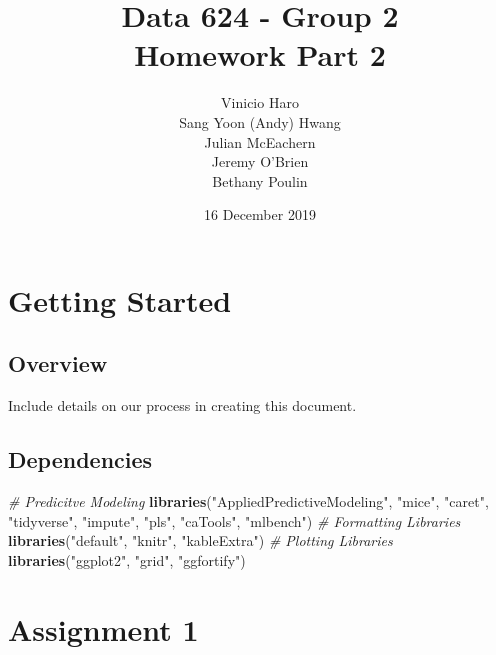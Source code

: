 \documentclass[]{report}
\title{Data 624 - Group 2\\
Homework Part 2}
\author{Vinicio Haro \\ Sang Yoon (Andy) Hwang \\ Julian McEachern \\ Jeremy O'Brien \\ Bethany Poulin}
\date{16 December 2019}
\newenvironment{Shaded}{\begin{snugshade}}{\end{snugshade}}
\newcommand{\CommentTok}[1]{\textcolor[rgb]{0.56,0.35,0.01}{\textit{#1}}}
\newcommand{\KeywordTok}[1]{\textcolor[rgb]{0.13,0.29,0.53}{\textbf{#1}}}
\newcommand{\NormalTok}[1]{#1}
\newcommand{\StringTok}[1]{\textcolor[rgb]{0.31,0.60,0.02}{#1}}
\begin{document}
\maketitle

{
\setcounter{tocdepth}{2}
\tableofcontents
}
\hypertarget{Overview}{%
\chapter*{Getting Started}\label{Overview}}

\hypertarget{overview}{%
\section{Overview}\label{overview}}

Include details on our process in creating this document.

\hypertarget{dependencies}{%
\section{Dependencies}\label{dependencies}}

\begin{Shaded}
\begin{Highlighting}[]
\CommentTok{# Predicitve Modeling}
\KeywordTok{libraries}\NormalTok{(}\StringTok{"AppliedPredictiveModeling"}\NormalTok{, }\StringTok{"mice"}\NormalTok{, }\StringTok{"caret"}\NormalTok{, }\StringTok{"tidyverse"}\NormalTok{, }
    \StringTok{"impute"}\NormalTok{, }\StringTok{"pls"}\NormalTok{, }\StringTok{"caTools"}\NormalTok{, }\StringTok{"mlbench"}\NormalTok{)}
\CommentTok{# Formatting Libraries}
\KeywordTok{libraries}\NormalTok{(}\StringTok{"default"}\NormalTok{, }\StringTok{"knitr"}\NormalTok{, }\StringTok{"kableExtra"}\NormalTok{)}
\CommentTok{# Plotting Libraries}
\KeywordTok{libraries}\NormalTok{(}\StringTok{"ggplot2"}\NormalTok{, }\StringTok{"grid"}\NormalTok{, }\StringTok{"ggfortify"}\NormalTok{)}
\end{Highlighting}
\end{Shaded}

\newpage

\hypertarget{AS-1}{%
\chapter*{Assignment 1}\label{AS-1}}

\end{document}
